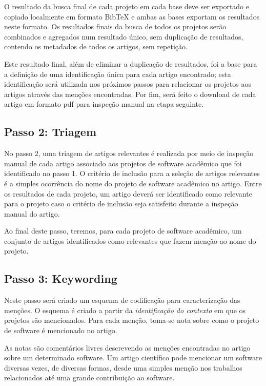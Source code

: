 O resultado da busca final de cada projeto em cada base deve ser exportado e
copiado localmente em formato BibTeX e ambas as bases exportam os resultados
neste formato. Os resultados finais da busca de todos os projetos serão combinados
e agregados num resultado único, sem duplicação de resultados, contendo os
metadados de todos os artigos, sem repetição.

Este resultado final, além de eliminar a duplicação de resultados, foi a base
para a definição de uma identificação única para cada artigo encontrado; esta
identificação será utilizada nos próximos passos para relacionar os projetos
aos artigos através das menções encontradas. Por fim, será feito o download de cada
artigo em formato pdf para inspeção manual na etapa seguinte.

\subsection{Passo 2: Triagem}

No passo 2, uma triagem de artigos relevantes é realizada por meio 
de inspeção manual de cada artigo associado aos projetos de software acadêmico
que foi identificado no passo 1.
O critério de inclusão para a seleção de artigos relevantes é a simples
ocorrência do nome do projeto de software acadêmico no artigo.
%
Entre os resultados de cada projeto,
um artigo deverá ser identificado como
relevante para o projeto caso o critério de inclusão seja satisfeito durante a
inspeção manual do artigo.

Ao final deste passo, teremos, para cada projeto
de software acadêmico, um conjunto de artigos identificados como relevantes que fazem
menção ao nome do projeto.

\subsection{Passo 3: Keywording}

Neste passo será criado um esquema de codificação para caracterização das
menções. O esquema é criado a partir da \textit{identificação do contexto} em que os
projetos são mencionados. Para cada menção, toma-se nota sobre como o projeto de
software é mencionado no artigo.

As notas são comentários livres descrevendo as menções encontradas no artigo
sobre um determinado software.
Um artigo científico pode mencionar um software
diversas vezes, de diversas formas, desde uma simples menção nos trabalhos
relacionados até uma grande contribuição ao software.

